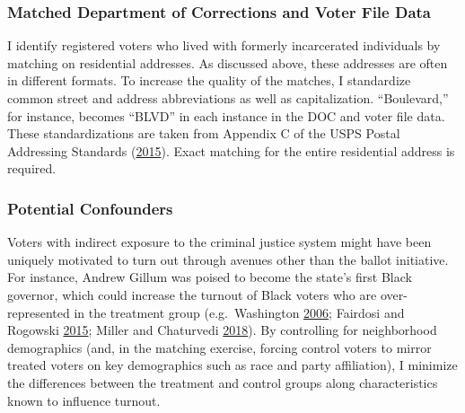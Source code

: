 \documentclass[
  12pt,
]{article}
\begin{document}
\hypertarget{matched-department-of-corrections-and-voter-file-data}{%
\subsubsection*{Matched Department of Corrections and Voter File Data}\label{matched-department-of-corrections-and-voter-file-data}}

I identify registered voters who lived with formerly incarcerated individuals by matching on residential addresses. As discussed above, these addresses are often in different formats. To increase the quality of the matches, I standardize common street and address abbreviations as well as capitalization. ``Boulevard,'' for instance, becomes ``BLVD'' in each instance in the DOC and voter file data. These standardizations are taken from Appendix C of the USPS Postal Addressing Standards (\protect\hyperlink{ref-USPS2015}{2015}). Exact matching for the entire residential address is required.

\hypertarget{potential-confounders}{%
\subsubsection*{Potential Confounders}\label{potential-confounders}}

Voters with indirect exposure to the criminal justice system might have been uniquely motivated to turn out through avenues other than the ballot initiative. For instance, Andrew Gillum was poised to become the state's first Black governor, which could increase the turnout of Black voters who are over-represented in the treatment group (e.g.~Washington \protect\hyperlink{ref-Washington2006}{2006}; Fairdosi and Rogowski \protect\hyperlink{ref-Fairdosi2015}{2015}; Miller and Chaturvedi \protect\hyperlink{ref-Miller2018}{2018}). By controlling for neighborhood demographics (and, in the matching exercise, forcing control voters to mirror treated voters on key demographics such as race and party affiliation), I minimize the differences between the treatment and control groups along characteristics known to influence turnout.
\end{document}
